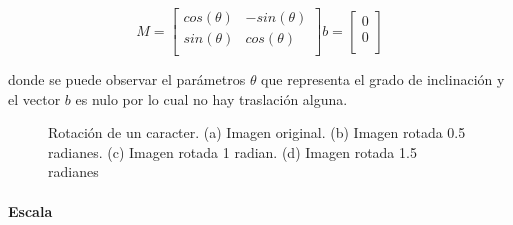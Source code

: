 			\begin{equation*}
					M =  
					\begin{bmatrix}
						cos(\theta) & -sin(\theta) \\
						sin(\theta) & cos(\theta)  \\
					\end{bmatrix}
					b =
					\begin{bmatrix}
						0 \\
						0 \\
					\end{bmatrix}	
			\end{equation*}

	donde se puede observar el parámetros $\theta$ que representa el grado de inclinación y el vector $b$ es nulo por lo cual no hay traslación alguna.

		\begin{figure}[htbp]
			\centering
			\caption[Rotación de un caracter]{Rotación de un caracter. (a) Imagen original. (b) Imagen rotada 0.5 radianes. (c) Imagen rotada 1 radian. (d) Imagen rotada 1.5 radianes}
			\label{fig: Transformacion Afin - Rotacion}
		\end{figure}	
			
		\paragraph{Escala}
			
